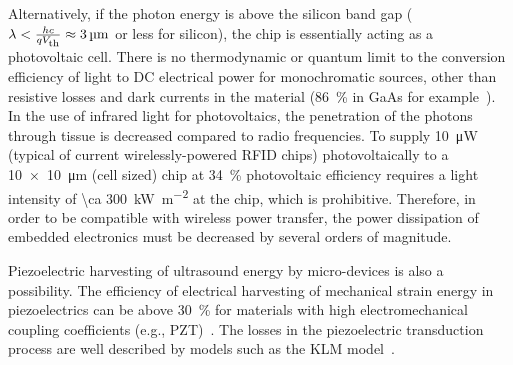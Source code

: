 Alternatively, if the photon energy is above the silicon band gap ($\lambda < \frac{h c}{qV_{\text{\scriptsize th}}} \approx \SI{3}{\micro\meter}$ or less for silicon), the chip is essentially acting as a photovoltaic cell.
There is no thermodynamic or quantum limit to the conversion efficiency of light to DC electrical power for monochromatic sources, other than resistive losses and dark currents in the material (\SI{86}{\percent} in GaAs for example~\cite{bett08}). 
In the use of infrared light for photovoltaics, the penetration of the photons through tissue is decreased compared to radio frequencies.
To supply \SI{10}{\micro\watt} (typical of current wirelessly-powered RFID chips) photovoltaically to a \SI{10 x 10}{\micro\meter} (cell sized) chip at \SI{34}{\percent} photovoltaic efficiency requires a light intensity of \SI{\ca 300}{\kilo\watt\per\meter\squared} at the chip, which is prohibitive.
Therefore, in order to be compatible with wireless power transfer, the power dissipation of embedded electronics must be decreased by several orders of magnitude.

Piezoelectric harvesting of ultrasound energy by micro-devices is also a possibility. The efficiency of electrical harvesting of mechanical strain energy in piezoelectrics can be above \SI{30}{\percent} for materials with high electromechanical coupling coefficients (e.g., PZT)~\cite{safari08, xu12}. The losses in the piezoelectric transduction process are well described by models such as the KLM model~\cite{krimholtz70,castillo03}.

